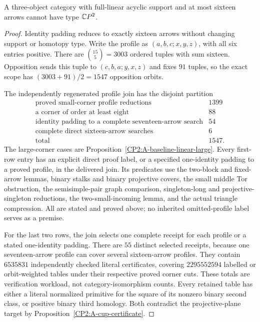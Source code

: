 \begin{theorem}
\label{CP2:A-linear-sixteen-complete}
A three-object category with full-linear acyclic support
and at most sixteen arrows cannot have type $\mathbb{C}P^2$.
\end{theorem}
\begin{proof}
Identity padding reduces to exactly sixteen arrows without
changing support or homotopy type. Write the profile as
$(a,b,c;x,y,z)$, with all six entries positive. There are
$\binom{15}{5}=3003$ ordered tuples with sum sixteen.
Opposition sends this tuple to $(c,b,a;y,x,z)$ and fixes
$91$ tuples, so the exact scope has
$(3003+91)/2=1547$ opposition orbits.

The independently regenerated profile join has the disjoint
partition
\[
\begin{array}{l|r}
\text{proved small-corner profile reductions}&1399\\
\text{a corner of order at least eight}&88\\
\text{identity padding to a complete seventeen-arrow search}&54\\
\text{complete direct sixteen-arrow searches}&6\\\hline
\text{total}&1547.
\end{array}
\]
The large-corner cases are
Proposition~\ref{CP2:A-baseline-linear-large}. Every first-row
entry has an explicit direct proof label, or a specified
one-identity padding to a proved profile, in the delivered
join. Its predicates use the two-block and fixed-arrow
lemmas, binary stalks and binary projective covers, the
small middle Tor obstruction, the semisimple-pair graph
comparison, singleton-long and projective-singleton
reductions, the two-small-incoming lemma, and the actual
triangle compression. All are stated and proved above;
no inherited omitted-profile label serves as a premise.

For the last two rows, the join selects one complete
receipt for each profile or a stated one-identity padding.
There are $55$ distinct selected receipts, because one
seventeen-arrow profile can cover several sixteen-arrow
profiles. They contain $6535831$ independently checked
literal certificates, covering $2295552594$ labelled or
orbit-weighted tables under their respective proved
corner cuts. These totals are verification workload,
not category-isomorphism counts. Every retained table
has either a literal normalized primitive for the square
of its nonzero binary second class, or positive binary
third homology. Both contradict the projective-plane
target by Proposition~\ref{CP2:A-cup-certificate}.


\end{proof}

